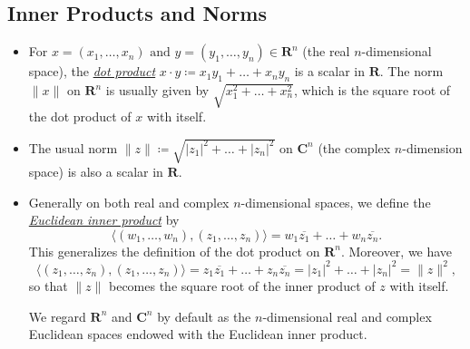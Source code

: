 \documentclass{article}
\newcommand{\df}[1]{\ul{\textit{#1}}}
\newcommand{\R}{\mathbf{R}}
\newcommand{\C}{\mathbf{C}}
\newcommand{\conj}[1]{\overline{#1}}
\newcommand{\inp}[2]{\langle #1, #2 \rangle}
\begin{document}
\subsection{Inner Products and Norms}
\begin{itemize}
    \item For $x=(x_1,\dots,x_n) \text{ and } y=(y_1,\dots,y_n) \in \R^n$ (the real $n$-dimensional space), the \df{dot product} $x \cdot y \coloneqq x_1y_1+\dots+x_ny_n$ is a scalar in $\R$. The norm $\|x\|$ on $\R^n$ is usually given by $\sqrt{x_1^2+\dots+x_n^2}$, which is the square root of the dot product of $x$ with itself.
    \item The usual norm $\|z\| \coloneqq  \sqrt{|z_1|^2+\dots+|z_n|^2}$ on $\C^n$ (the complex $n$-dimension space) is also a scalar in $\R$.
    \item Generally on both real and complex $n$-dimensional spaces, we define the \df{Euclidean inner product} by $$\inp{(w_1,\dots,w_n)}{(z_1,\dots,z_n)} =  w_1\conj{z_1}+\dots+w_n\conj{z_n}.$$ This generalizes the definition of the dot product on $\R^n$. Moreover, we have $$\inp{(z_1,\dots,z_n)}{(z_1,\dots,z_n)} = z_1\conj{z_1}+\dots+z_n\conj{z_n} = |z_1|^2 + \dots + |z_n|^2 = \|z\|^2,$$ so that $\|z\|$ becomes the square root of the inner product of $z$ with itself.
    
    We regard $\R^n$ and $\C^n$ by default as the $n$-dimensional real and complex Euclidean spaces endowed with the Euclidean inner product. 
    

\end{itemize}
\end{document}
